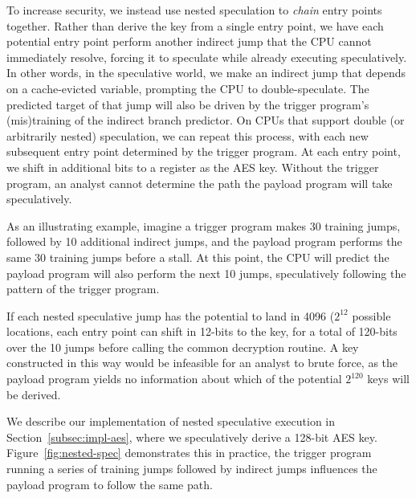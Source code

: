 To increase security,
we instead use nested speculation to \emph{chain} entry
points together. Rather than derive the key from a single entry point, we have
each potential entry point perform another indirect jump that the CPU cannot
immediately resolve, forcing it to speculate while already executing
speculatively. In other words, in the speculative world, we make an
indirect jump that depends on a cache-evicted variable, prompting the CPU to double-speculate.
The predicted target of that jump will also be driven by the
trigger program's (mis)training of the indirect branch predictor.
On CPUs that support double (or arbitrarily nested)
speculation, we can repeat this process, with each new subsequent entry point
determined by the trigger program. At each entry point, we shift in additional
bits to a register as the AES key. Without the trigger program, an analyst
cannot determine the path the payload program will take speculatively.

%

As an illustrating example,
imagine a trigger program makes 30 training jumps, followed by 10
additional indirect jumps, and the payload program performs the same 30 training
jumps before a stall. At this point,
the CPU will predict the payload program will also perform
the next 10 jumps, speculatively following the pattern of the trigger program.


If each nested speculative jump has the potential to land in 4096 ($2^{12}$ possible locations,
each
entry point can shift in 12-bits to the key, for a total of 120-bits over the
10 jumps before calling the common decryption routine. A key constructed in this
way would be infeasible
for an analyst to brute force, as the payload program yields no information
about which of the potential $2^{120}$ keys will be derived.

We describe our implementation of nested speculative execution in
Section~\ref{subsec:impl-aes}, where we speculatively derive a 128-bit AES key.
Figure~\ref{fig:nested-spec} demonstrates this in practice, the trigger program
running a series of training jumps followed by indirect jumps influences the
payload program to follow the same path.

